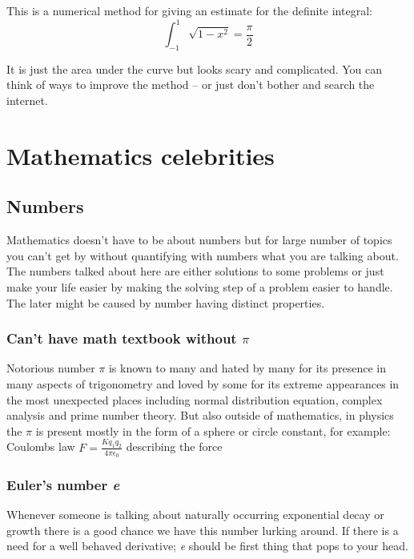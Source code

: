 \documentclass[pdftex, 12pt, a4paper]{report}
\begin{document}
	This is a numerical method for giving an estimate for the definite integral: $$\int_{-1}^{1}\sqrt{1-x^2} = \frac{\pi}{2}$$
	
	It is just the area under the curve but looks scary and complicated. You can think of ways to improve the method -- or just don't bother and search the internet.



	\chapter{Mathematics celebrities}
	
	\section{Numbers}
	
	Mathematics doesn't have to be about numbers but for large number of topics you can't get by without quantifying with numbers what you are talking about. The numbers talked about here are either solutions to some problems or just make your life easier by making the solving step of a problem easier to handle. The later might be caused by number having distinct properties.\par
	
	\subsection{Can't have math textbook without $\pi$}
	
	Notorious number $\pi$ is known to many and hated by many for its presence in many aspects of trigonometry and loved by some for its extreme appearances in the most unexpected places including normal distribution equation, complex analysis and prime number theory. But also outside of mathematics, in physics the $\pi$ is present mostly in the form of a sphere or circle constant, for example: Coulombs law $F =\frac{Kq_1q_2}{4\pi\epsilon_0}$ describing the force 
	
	\subsection{Euler's number \textit{e}}
	Whenever someone is talking about naturally occurring exponential decay or growth there is a good chance we have this number lurking around. If there is a need for a well behaved derivative; \textit{e} should be first thing that pops to your head.
\end{document}
